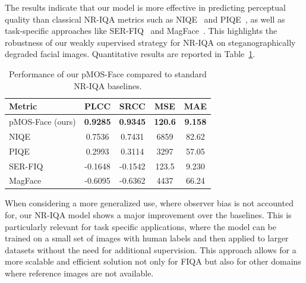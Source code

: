 The results indicate that our model is more effective in predicting perceptual quality than classical NR-IQA metrics such as NIQE~\cite{mittal2013making} and PIQE~\cite{piqe2016}, as well as task-specific approaches like SER-FIQ~\cite{terhorst2020serfiq} and MagFace~\cite{meng2021magface}. This highlights the robustness of our weakly supervised strategy for NR-IQA on steganographically degraded facial images. Quantitative results are reported in Table~\ref{tab:nr_scores}.

\begin{table}
\centering
\caption{Performance of our pMOS-Face compared to standard NR-IQA baselines.}\label{tab:nr_scores}
\begin{tabular}{lcccc}
\toprule
\textbf{Metric} & \textbf{PLCC} & \textbf{SRCC} & \textbf{MSE} & \textbf{MAE} \\
\midrule
pMOS-Face (ours) & \textbf{0.9285} & \textbf{0.9345} & \textbf{120.6} & \textbf{9.158} \\
NIQE                 & 0.7536          & 0.7431          & 6859        & 82.62 \\
PIQE                 & 0.2993          & 0.3114          & 3297        & 57.05 \\
SER-FIQ              & -0.1648         & -0.1542         & 123.5         & 9.230 \\
MagFace              & -0.6095         & -0.6362         & 4437        & 66.24 \\
\bottomrule
\end{tabular}
\end{table}

When considering a more generalized use, where observer bias is not accounted for, our NR-IQA model shows a major improvement over the baselines. This is particularly relevant for task specific applications, where the model can be trained on a small set of images with human labels and then applied to larger datasets without the need for additional supervision. This approach allows for a more scalable and efficient solution not only for FIQA but also for other domains where reference images are not available.
